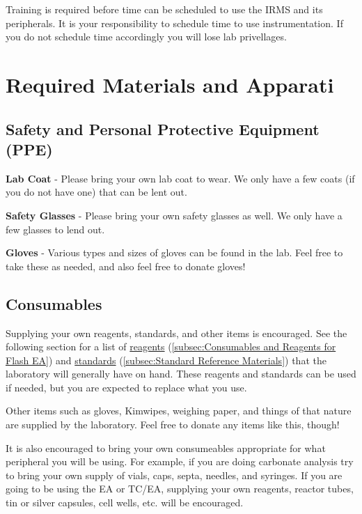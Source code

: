\documentclass[12pt]{../SOP3}\usepackage[]{graphicx}\usepackage[]{color}
\begin{document}
\NP Training is required before time can be scheduled to use the IRMS and its peripherals. It is your responsibility to schedule time to use instrumentation. If you do not schedule time accordingly you will lose lab privellages.


\section{Required Materials and Apparati}

\subsection{Safety and Personal Protective Equipment (PPE)}

\NP \textbf{Lab Coat} - Please bring your own lab coat to wear. We only have a few coats (if you do not have one) that can be lent out.

\NP \textbf{Safety Glasses} - Please bring your own safety glasses as well. We only have a few glasses to lend out.

\NP \textbf{Gloves} - Various types and sizes of gloves can be found in the lab. Feel free to take these as needed, and also feel free to donate gloves!

\subsection{Consumables}

\NP Supplying your own reagents, standards, and other items is encouraged. See the following section for a list of \hyperref[subsec:Consumables and Reagents for Flash EA]{reagents} (\ref{subsec:Consumables and Reagents for Flash EA}) and \hyperref[subsec:Standard Reference Materials]{standards} (\ref{subsec:Standard Reference Materials}) that the laboratory will generally have on hand. These reagents and standards can be used if needed, but you are expected to replace what you use.

\NP Other items such as gloves, Kimwipes, weighing paper, and things of that nature are supplied by the laboratory. Feel free to donate any items like this, though!

\NP It is also encouraged to bring your own consumeables appropriate for what peripheral you will be using. For example, if you are doing carbonate analysis try to bring your own supply of vials, caps, septa, needles, and syringes. If you are going to be using the EA or TC/EA, supplying your own reagents, reactor tubes, tin or silver capsules, cell wells, etc. will be encouraged.
\end{document}
